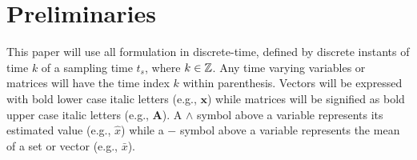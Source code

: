 
\section{Preliminaries} \label{sec:preliminaries}

This paper will use all formulation in discrete-time, defined by discrete instants of time $k$ of a sampling time $t_s$, where $k \in \mathbb{Z}$. Any time varying variables or matrices will have the time index $k$ within parenthesis. Vectors will be expressed with bold lower case italic letters (e.g., $\bm{x}$) while matrices will be signified as bold upper case italic letters (e.g., $\bm{A}$). A $\wedge$ symbol above a variable represents its estimated value (e.g., $\hat{x}$) while a $-$ symbol above a variable represents the mean of a set or vector (e.g., $\bar{x}$).


